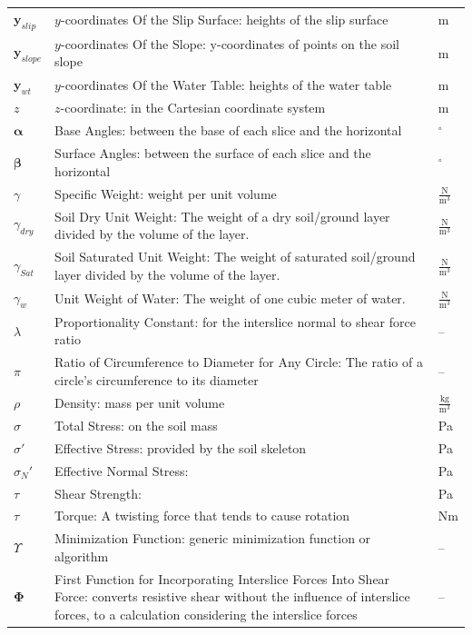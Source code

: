 \documentclass[12pt]{article}
\begin{document}
\begin{longtabu}{l X[l] l}
\\
${\mathbf{y}_{slip}}$ & $y$-coordinates Of the Slip Surface: heights of the slip surface & m
\\
${\mathbf{y}_{slope}}$ & $y$-coordinates Of the Slope: y-coordinates of points on the soil slope & m
\\
${\mathbf{y}_{wt}}$ & $y$-coordinates Of the Water Table: heights of the water table & m
\\
$z$ & $z$-coordinate: in the Cartesian coordinate system & m
\\
$\mathbf{α}$ & Base Angles: between the base of each slice and the horizontal & ${}^{\circ}$
\\
$\mathbf{β}$ & Surface Angles: between the surface of each slice and the horizontal & ${}^{\circ}$
\\
$γ$ & Specific Weight: weight per unit volume & $\frac{\text{N}}{\text{m}^{3}}$
\\
${γ_{dry}}$ & Soil Dry Unit Weight: The weight of a dry soil/ground layer divided by the volume of the layer. & $\frac{\text{N}}{\text{m}^{3}}$
\\
${γ_{Sat}}$ & Soil Saturated Unit Weight: The weight of saturated soil/ground layer divided by the volume of the layer. & $\frac{\text{N}}{\text{m}^{3}}$
\\
${γ_{w}}$ & Unit Weight of Water: The weight of one cubic meter of water. & $\frac{\text{N}}{\text{m}^{3}}$
\\
$λ$ & Proportionality Constant: for the interslice normal to shear force ratio & --
\\
$π$ & Ratio of Circumference to Diameter for Any Circle: The ratio of a circle's circumference to its diameter & --
\\
$ρ$ & Density: mass per unit volume & $\frac{\text{kg}}{\text{m}^{3}}$
\\
$σ$ & Total Stress: on the soil mass & Pa
\\
$σ'$ & Effective Stress: provided by the soil skeleton & Pa
\\
${σ_{N}}'$ & Effective Normal Stress:  & Pa
\\
$τ$ & Shear Strength:  & Pa
\\
$τ$ & Torque: A twisting force that tends to cause rotation & Nm
\\
$Υ$ & Minimization Function: generic minimization function or algorithm & --
\\
$\mathbf{Φ}$ & First Function for Incorporating Interslice Forces Into Shear Force: converts resistive shear without the influence of interslice forces, to a calculation considering the interslice forces & --

\end{longtabu}
\end{document}
